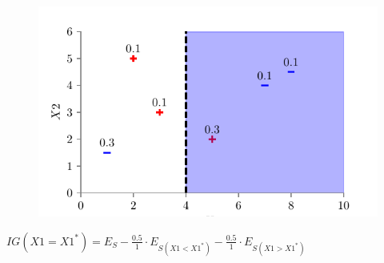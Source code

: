 \documentclass[usenames,dvipsnames]{beamer}
\begin{document}
\begin{frame}

\begin{figure}
	\centering
	\includegraphics{../figures/dt_weighted/fig5.pdf}
\end{figure}

\( IG(X1 = X1^* ) = E_S - \frac{0.5}{1} \cdot E_{S(X1 < X1^*)}  - \frac{0.5}{1} \cdot E_{S(X1 > X1^*)}\)

\end{frame}
\end{document}
